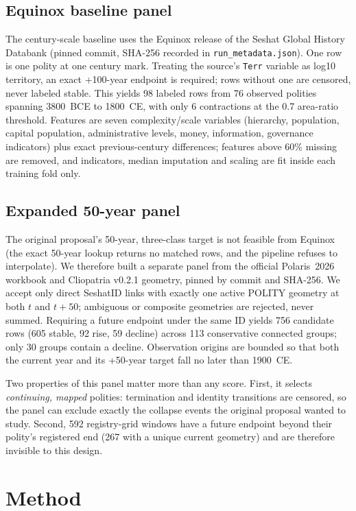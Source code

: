 \documentclass[conference]{IEEEtran}
\begin{document}
\subsection{Equinox baseline panel}
The century-scale baseline uses the Equinox release of the Seshat Global History
Databank (pinned commit, SHA-256 recorded in \texttt{run\_metadata.json}). One row
is one polity at one century mark. Treating the source's \texttt{Terr} variable as
log10 territory, an exact +100-year endpoint is required; rows without one are
censored, never labeled stable. This yields 98 labeled rows from 76 observed
polities spanning 3800~BCE to 1800~CE, with only 6 contractions at the 0.7
area-ratio threshold. Features are seven complexity/scale variables (hierarchy,
population, capital population, administrative levels, money, information,
governance indicators) plus exact previous-century differences; features above
60\% missing are removed, and indicators, median imputation and scaling are fit
inside each training fold only.

\subsection{Expanded 50-year panel}
The original proposal's 50-year, three-class target is not feasible from Equinox
(the exact 50-year lookup returns no matched rows, and the pipeline refuses to
interpolate). We therefore built a separate panel from the official Polaris~2026
workbook and Cliopatria v0.2.1 geometry, pinned by commit and SHA-256. We accept
only direct SeshatID links with exactly one active POLITY geometry at both $t$ and
$t+50$; ambiguous or composite geometries are rejected, never summed. Requiring a
future endpoint under the same ID yields 756 candidate rows (605 stable, 92 rise,
59 decline) across 113 conservative connected groups; only 30 groups contain a
decline. Observation origins are bounded so that both the current year and its
+50-year target fall no later than 1900~CE.

Two properties of this panel matter more than any score. First, it selects
\emph{continuing, mapped} polities: termination and identity transitions are
censored, so the panel can exclude exactly the collapse events the original
proposal wanted to study. Second, 592 registry-grid windows have a future endpoint
beyond their polity's registered end (267 with a unique current geometry) and are
therefore invisible to this design.

\section{Method}
\end{document}
